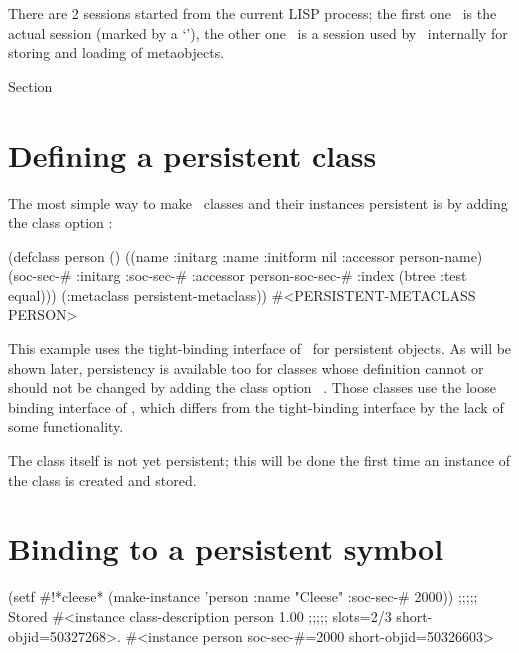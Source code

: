 There are 2 sessions started from the current LISP process; the first
one \oi\ is the actual session (marked by a `\lisp{*}'), the other one
\oii\ is a session used by \plob\ internally for storing and loading
of metaobjects.

 Section 

\section{Defining a persistent class}%
\label{sec:QuickTourDefclass}

The most simple way to make \clos\ classes and their instances
persistent is by adding the class option :
\begin{CompactCode}
\listener{}(defclass person ()
              ((name :initarg :name :initform nil :accessor person-name)
               (soc-sec-# :initarg :soc-sec-#
                          :accessor person-soc-sec-#
                          :index (btree :test equal)))
              (:metaclass persistent-metaclass))
#<PERSISTENT-METACLASS PERSON>
\end{CompactCode}

This example uses the tight-binding interface of \plob\ for persistent
objects. As will be shown later, persistency is available too for
classes whose definition cannot or should not be changed by adding the
class option \ . Those
classes use the loose binding interface of \plob, which differs from
the tight-binding interface by the lack of some functionality.

The class itself is not yet persistent; this will be done the first
time an instance of the class is created and stored.

\section{Binding to a persistent symbol}

\begin{CompactCode}
\listener{}(setf #!*cleese*\marginnumber{\smalloi}
              (make-instance 'person :name "Cleese" :soc-sec-# 2000))
;;;;; Stored #<instance class-description person 1.00\marginnumber{\smalloii}
;;;;;                   slots=2/3 short-objid=50327268>.
#<instance person soc-sec-#=2000 short-objid=50326603>\marginnumber{\smalloiii}
\end{CompactCode}

